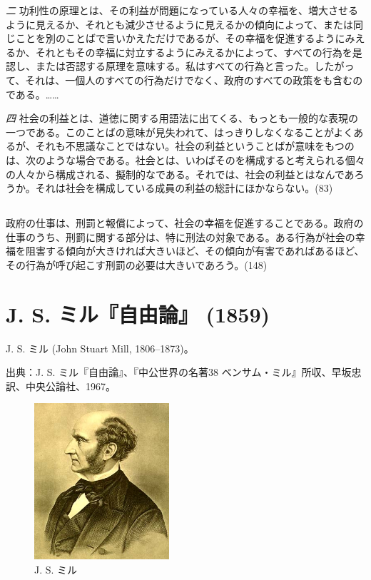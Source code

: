 \emph{二} 功利性の原理とは、その利益が問題になっている人々の幸福を、増大させるように見えるか、それとも減少させるように見えるかの傾向によって、または同じことを別のことばで言いかえただけであるが、その幸福を促進するようにみえるか、それともその幸福に対立するようにみえるかによって、すべての行為を是認し、または否認する原理を意味する。私はすべての行為と言った。したがって、それは、一個人のすべての行為だけでなく、政府のすべての政策をも含むのである。……

\emph{四} 社会の利益とは、道徳に関する用語法に出てくる、もっとも一般的な表現の一つである。このことばの意味が見失われて、はっきりしなくなることがよくあるが、それも不思議なことではない。社会の利益ということばが意味をもつのは、次のような場合である。社会とは、いわばそのを構成すると考えられる個々の人々から構成される、擬制的なである。それでは、社会の利益とはなんであろうか。それは社会を構成している成員の利益の総計にほかならない。(83)





\subsection{}

政府の仕事は、刑罰と報償によって、社会の幸福を促進することである。政府の仕事のうち、刑罰に関する部分は、特に刑法の対象である。ある行為が社会の幸福を阻害する傾向が大きければ大きいほど、その傾向が有害であればあるほど、その行為が呼び起こす刑罰の必要は大きいであろう。(148)





\newpage{}
\section{J. S. ミル『自由論』 (1859)}


J. S. ミル (John Stuart Mill, 1806--1873)。

出典：J. S. ミル『自由論』、『中公世界の名著38 ベンサム・ミル』所収、早坂忠訳、中央公論社、1967。






     \begin{figure}[htbp]
       \centering
         \includegraphics[width=50mm]{images/JohnStuartMill.jpg}
       \caption{J. S. ミル}
     \end{figure}


